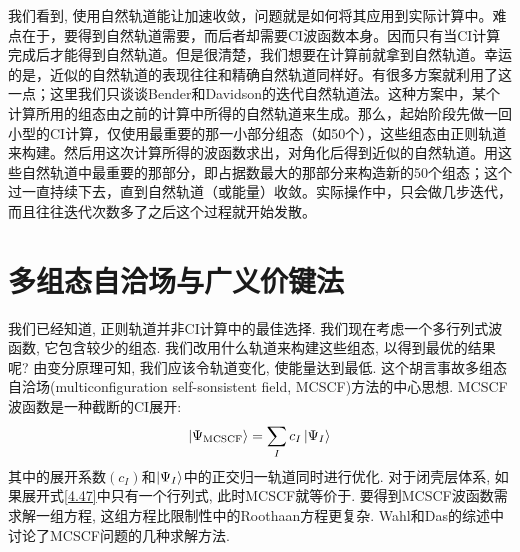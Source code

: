 我们看到, 使用自然轨道能让加速收敛，问题就是如何将其应用到实际计算中。难点在于，要得到自然轨道需要，而后者却需要CI波函数本身。因而只有当CI计算完成后才能得到自然轨道。但是很清楚，我们想要在计算前就拿到自然轨道。幸运的是，近似的自然轨道的表现往往和精确自然轨道同样好。有很多方案就利用了这一点；这里我们只谈谈Bender和Davidson的迭代自然轨道法。这种方案中，某个计算所用的组态由之前的计算中所得的自然轨道来生成。那么，起始阶段先做一回小型的CI计算，仅使用最重要的那一小部分组态（如50个），这些组态由正则\hft 轨道来构建。然后用这次计算所得的波函数求出，对角化后得到近似的自然轨道。用这些自然轨道中最重要的那部分，即占据数最大的那部分来构造新的50个组态；这个过一直持续下去，直到自然轨道（或能量）收敛。实际操作中，只会做几步迭代，而且往往迭代次数多了之后这个过程就开始发散。
\section{多组态自洽场与广义价键法}
\label{sec4.5}
我们已经知道, 正则\hft 轨道并非CI计算中的最佳选择. 我们现在考虑一个多行列式波函数, 它包含较少的组态. 我们改用什么轨道来构建这些组态, 以得到最优的结果呢? 由变分原理可知, 我们应该令轨道变化, 使能量达到最低. 这个胡言事故多组态自洽场(multiconfiguration self-sonsistent field, MCSCF)方法的中心思想. MCSCF波函数是一种截断的CI展开:
\begin{align}
\Ket{\Psi_\mathrm{MCSCF}} = \sum_I c_I\Ket{\Psi_I}
\label{4.47}
\end{align}
其中的展开系数$(c_I)$和$\Ket{\Psi_I}$中的正交归一轨道同时进行优化. 对于闭壳层体系, 如果展开式\eqref{4.47}中只有一个行列式, 此时MCSCF就等价于\hft. 要得到MCSCF波函数需求解一组方程, 这组方程比限制性\hft 中的Roothaan方程更复杂. Wahl和Das的综述中讨论了MCSCF问题的几种求解方法.

